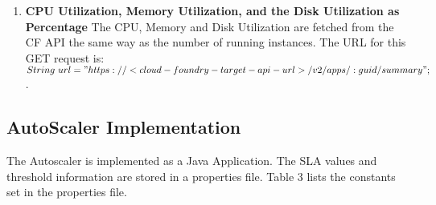\documentclass[article,type=msc,colorback,12pt,accentcolor=tud7b,table]{tudthesis}
\begin{document}
\begin{enumerate}
\begin{lstlisting}
int responseCode = con.getResponseCode();
System.out.println("\nSending 'GET' request to URL : " + url);
System.out.println("Response Code : " + responseCode);

if(responseCode == 200){
 BufferedReader in = new BufferedReader(
	new InputStreamReader(con.getInputStream()));
 String inputLine;
 StringBuffer response = new StringBuffer();	
 while ((inputLine = in.readLine()) != null) {
		response.append(inputLine);
 }
 in.close();	
 String respose_str = response.toString();
 double avg_cpu_all_instances = ParseCFJsonResponses
	        .parseJsonGetCPUAvg(respose_str);
 MonitoringService.cpu.add(avg_cpu_all_instances);
}	
\end{lstlisting}
	
	The authorization token to access the API is fetched by making calling the cf call: $cf oauth-token$. The URL is the CF API end point and the :guid in the URL is the GUID of the application which is retrieved from the Environment variables of the application. The environmnetal variables is accessed by the CF call: $cf env app-name$
	
	\item\textbf{{CPU Utilization, Memory Utilization, and the Disk Utilization as Percentage}} 
	 The CPU, Memory and Disk Utilization are fetched from the CF API the same way as the number of running instances. The URL for this GET request is:  \newline
	$ String\ url = "https://<cloud-foundry-target-api-url>/v2/apps/:guid/summary"; $. 
	
\end{enumerate}	
	
	\subsection{AutoScaler Implementation} 
	
	The Autoscaler is implemented as a Java Application. The SLA values and threshold information are stored in a properties file. Table 3 lists the constants set in the properties file. 
	
\end{document}
